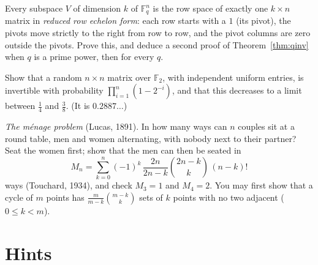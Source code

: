 \begin{exercise}[$\star\star$]\label{ex:rref}
Every subspace $V$ of dimension $k$ of $\mathbb F_q^n$ is the row space of exactly one $k\times n$ matrix in \emph{reduced row echelon form}: each row
starts with a $1$ (its pivot), the pivots move strictly to the right from row to row, and the pivot columns are zero outside the
pivots. Prove this, and deduce a second proof of Theorem~\ref{thm:qinv} when $q$ is a prime power, then for every $q$.
\end{exercise}

\begin{exercise}[$\star$]\label{ex:glprob}
Show that a random $n\times n$ matrix over $\mathbb F_2$, with independent uniform entries, is invertible with probability $\prod_{i=1}^n(1-2^{-i})$, and
that this decreases to a limit between $\frac14$ and $\frac38$. (It is $0.2887\ldots$)
\end{exercise}

\begin{exercise}[$\star\star\star$]\label{ex:menage}
\emph{The m\'enage problem} (Lucas, 1891). In how many ways can $n$ couples sit at a round table, men and women alternating, with
nobody next to their partner? Seat the women first; show that the men can then be seated in
\[
M_n=\sum_{k=0}^n(-1)^k\,\frac{2n}{2n-k}\binom{2n-k}k\,(n-k)!
\]
ways (Touchard, 1934), and check $M_3=1$ and $M_4=2$. You may first show that a cycle of $m$ points has $\frac m{m-k}\binom{m-k}k$ sets of $k$
points with no two adjacent ($0\le k<m$).
\end{exercise}

\section{Hints}

